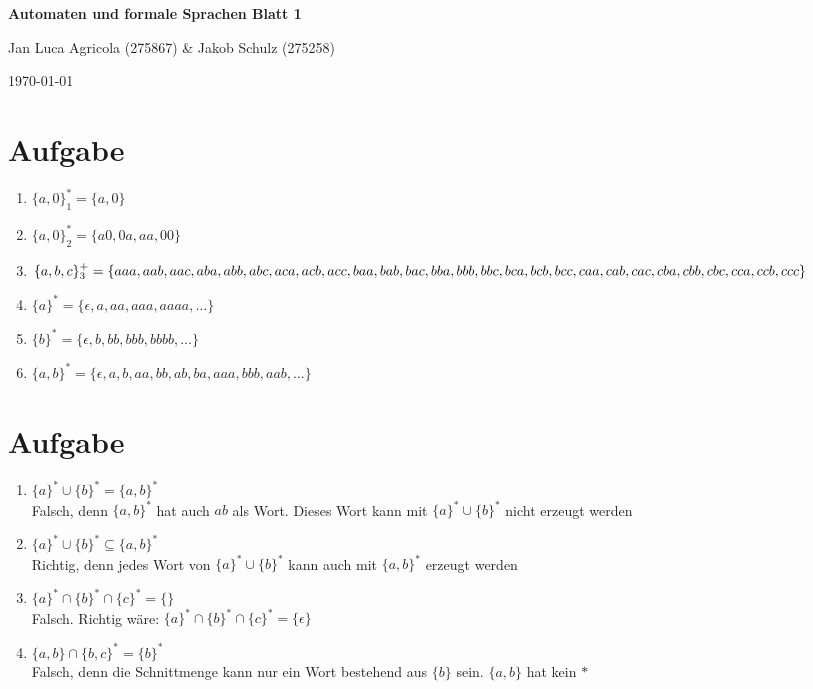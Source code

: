 \documentclass[a4paper,12pt,titlepage]{article}
\begin{document}
\begin{titlepage}
    \centering
    \vspace*{2cm}
    {\LARGE\bfseries Automaten und formale Sprachen Blatt 1\par}
    \vspace{2cm}
    {\Large Jan Luca Agricola (275867) \& Jakob Schulz (275258)\par}
    \vspace{2cm}
    {\large\today\par}
\end{titlepage}

\section{Aufgabe}
\begin{enumerate}
\item $\{a, 0\}^*_1 = \{a, 0\}$
\item $\{a, 0\}^*_2 = \{a0, 0a, aa, 00\}$
\item $\{a, b, c\}^+_3 = \{aaa, aab, aac, aba, abb, abc, aca, acb, acc, baa, bab, bac,\\
bba, bbb, bbc, bca, bcb, bcc, caa, cab, cac, cba, cbb, cbc, cca, ccb, ccc\}$
\item $\{a\}^* = \{\epsilon, a, aa, aaa, aaaa,...\}$
\item $\{b\}^* = \{\epsilon, b, bb, bbb, bbbb,...\}$
\item  $\{a, b\}^* = \{\epsilon, a, b, aa, bb, ab, ba, aaa, bbb, aab, ...\}$
\end{enumerate}
\section{Aufgabe}
\begin{enumerate}
\item $\{a\}^* \cup \{b\}^*  = \{a, b\}^*$\\
Falsch, denn $\{a, b\}^*$ hat auch $ab$ als Wort. Dieses Wort kann mit  $\{a\}^* \cup \{b\}^*$ nicht erzeugt werden
\item $\{a\}^* \cup \{b\}^*  \subseteq \{a, b\}^*$\\
Richtig, denn jedes Wort von $\{a\}^* \cup \{b\}^*$ kann auch mit $\{a, b\}^*$ erzeugt werden
\item $\{a\}^* \cap \{b\}^* \cap \{c\}^*  = \{\}$\\
Falsch. Richtig wäre:  $\{a\}^* \cap \{b\}^* \cap \{c\}^*  = \{\epsilon\}$
\item $\{a, b\} \cap \{b, c\}^* = \{b\}^*$\\
Falsch, denn die Schnittmenge kann nur ein Wort bestehend aus $\{b\}$ sein. $\{a, b\}$ hat kein $*$
\end{enumerate}
\end{document}
